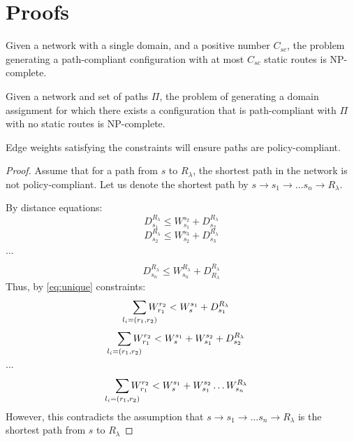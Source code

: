 \section{Proofs}
\begin{theorem}
\label{thm:ospfsynth}
Given a
network with a single domain,
and a positive number $C_{sc}$,
the problem generating
a path-compliant configuration with at most $C_{sc}$ static routes
is NP-complete.
\end{theorem}


\begin{theorem}
	Given a
	network and  set of paths  $\Pi$,
	the problem of generating a domain assignment for which
	there exists a 
	configuration that is path-compliant with $\Pi$ with no static routes
	is NP-complete.
\end{theorem}


\begin{theorem}[Correctness]
	Edge weights satisfying the constraints will ensure paths 
	are policy-compliant. 
\end{theorem}
\begin{proof}
	Assume that for a path from $s$ to $R_\lambda$, the shortest path in the network
	is not policy-compliant. Let us denote the shortest path by $s \rightarrow
	s_1 \rightarrow \ldots s_n \rightarrow R_\lambda$. 

	
	By distance equations: 
	\[
	D_{s_1}^{R_\lambda} \leq W_{s_1}^{s_2} + D_{s_2}^{R_\lambda} 
\]
\[
	D_{s_2}^{R_\lambda} \leq W_{s_2}^{s_3} + D_{s_3}^{R_\lambda} 
\]
\begin{center}
	$\ldots$
\end{center}
\[
D_{s_n}^{R_\lambda} \leq W_{s_n}^{R_\lambda} + D_{R_\lambda}^{R_\lambda} 
\]
	Thus, by \cref{eq:unique} constraints:
\[
	\sum_{\mathclap{\substack{l_i=(r_1,r_2)}}} 
	W_{r_1}^{r_2} < W_{s}^{s_1}+ D_{s_1}^{R_\lambda}
\]
\[
\sum_{\mathclap{\substack{l_i=(r_1,r_2)}}} 
W_{r_1}^{r_2} < W_{s}^{s_1}+W_{s_1}^{s_2} +  D_{s_2}^{R_\lambda}
\]
\begin{center}
$\ldots$
\end{center}
		\[\sum_{\mathclap{\substack{l_i=(r_1,r_2)}}} 
		W_{r_1}^{r_2} < W_{s}^{s_1}+ W_{s_1}^{s_2} \ldots W_{s_n}^{R_\lambda}
		\]
However, this contradicts the assumption that $s \rightarrow
s_1 \rightarrow \ldots s_n \rightarrow R_\lambda$ is the shortest path from $s$ to $R_\lambda$
\end{proof}